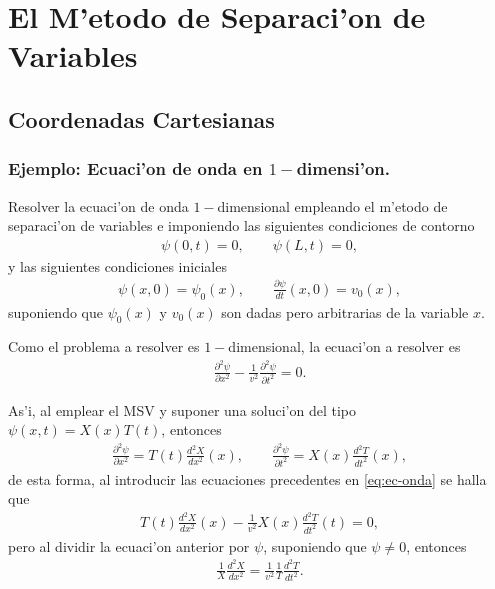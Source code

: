 \chapter{El M'etodo de Separaci'on de Variables}

\section{Coordenadas Cartesianas}
\subsection{Ejemplo: Ecuaci'on de onda en $1-$dimensi'on.}
Resolver la ecuaci'on de onda $1-$dimensional empleando el m'etodo de separaci'on de variables e imponiendo las siguientes condiciones de contorno 
\begin{align}
\psi(0,t)=0,\qquad \psi(L,t)=0,\label{eq:cond-borde}
\end{align}
y las siguientes condiciones iniciales 
\begin{align}
\psi(x,0)=\psi_{0}(x),\qquad \frac{\partial \psi}{dt}(x,0)=v_{0}(x),\label{eq:cond-inicial}
\end{align}
suponiendo que $\psi_{0}(x)$ y $v_{0}(x)$ son dadas pero arbitrarias de la variable $x$.

Como el problema a resolver es $1-$dimensional, la ecuaci'on a resolver es
\begin{align}
\frac{\partial^2 \psi}{\partial x^2}-\frac{1}{v^2}\frac{\partial^2 \psi}{\partial t^2}=0.\label{eq:ec-onda}
\end{align}

As'i, al emplear el MSV y suponer una soluci'on del tipo $\psi(x,t)=X(x)T(t)$, entonces
\begin{align}
\frac{\partial^2 \psi}{\partial x^2}=T(t) \frac{d^2X}{dx^2}(x),\qquad \frac{\partial^2 \psi}{\partial t^2}=X(x) \frac{d^2 T}{dt^2}(x),
\end{align}
de esta forma, al introducir las ecuaciones precedentes en \eqref{eq:ec-onda} se halla que
\begin{align}
T(t) \frac{d^2X}{dx^2}(x)-\frac{1}{v^2}X(x) \frac{d^2 T}{dt^2}(t)=0,
\end{align}
pero al dividir la ecuaci'on anterior por $\psi$, suponiendo que $\psi \neq 0$, entonces
\begin{align}
\frac{1}{X}\frac{d^2 X}{dx^2}=\frac{1}{v^2}\frac{1}{T}\frac{d^2 T}{dt^2}.\label{eq:ec-separable}
\end{align} 


